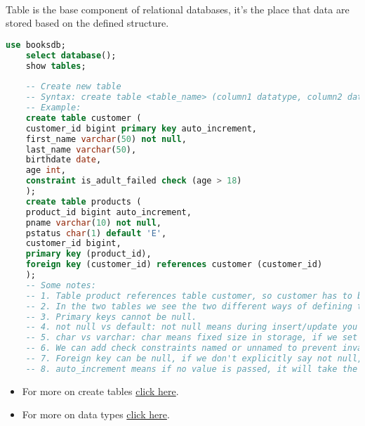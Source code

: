 \paragraph{} Table is the base component of relational databases, it's the place that data are stored based on the defined structure.
\begin{lstlisting}[language=SQL]
	use booksdb;
	select database();
	show tables;
	
	-- Create new table
	-- Syntax: create table <table_name> (column1 datatype, column2 datatype, column3 datatype ....);
	-- Example:
	create table customer (
	customer_id bigint primary key auto_increment,
	first_name varchar(50) not null,
	last_name varchar(50),
	birthdate date,
	age int,
	constraint is_adult_failed check (age > 18)
	);
	create table products (
	product_id bigint auto_increment,
	pname varchar(10) not null,
	pstatus char(1) default 'E',
	customer_id bigint,
	primary key (product_id),
	foreign key (customer_id) references customer (customer_id)
	);
	-- Some notes:
	-- 1. Table product references table customer, so customer has to be created first.
	-- 2. In the two tables we see the two different ways of defining the primary key; the primary key may consist of more than one column.
	-- 3. Primary keys cannot be null.
	-- 4. not null vs default: not null means during insert/update you have to give any non null valid value for that column. Default means, if no value is passed during insert for that column, default value will be used. However during insert or update, null is a valid value to set for the column.
	-- 5. char vs varchar: char means fixed size in storage, if we set char(10) for example, even if we give as value the string 'Hi', the space used in storage will be for 10 chars. With varchar(10) however the size is not fixed, depending on the size of the string, the required space will be used. In both cases, string longer than the given value will cause failure or data to be truncated.
	-- 6. We can add check constraints named or unnamed to prevent invalid data from being inserted in the database.
	-- 7. Foreign key can be null, if we don't explicitly say not null, however if value is given, that value must exist in the reference table.
	-- 8. auto_increment means if no value is passed, it will take the max value of that table column + 1.
\end{lstlisting}
\begin{itemize}
	\item For more on create tables \href{https://dev.mysql.com/doc/refman/8.0/en/create-table.html}{click here}.
	\item For more on data types \href{https://dev.mysql.com/doc/refman/8.0/en/data-types.html}{click here}.
\end{itemize}
